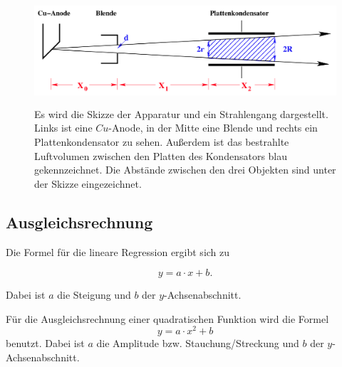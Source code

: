 \begin{figure}
    \centering
    \includegraphics[width=12cm, height=4cm]{build/strahl.png}
    \caption{Es wird die Skizze der Apparatur und ein Strahlengang dargestellt. Links ist eine $Cu$-Anode, in der Mitte eine Blende und rechts ein Plattenkondensator zu sehen. Außerdem ist das bestrahlte Luftvolumen zwischen den Platten des Kondensators blau gekennzeichnet. Die Abstände zwischen den drei Objekten sind unter der Skizze eingezeichnet.\cite{V607}}
    \label{fig:Strahlgeometrie}
\end{figure}

\subsection{Ausgleichsrechnung}

Die Formel für die lineare Regression ergibt sich zu 

\begin{equation}
    y = a \cdot x + b.
    \label{eqn:linreg}
\end{equation}

\noindent Dabei ist $a$ die Steigung und $b$ der $y$-Achsenabschnitt.

\noindent Für die Ausgleichsrechnung einer quadratischen Funktion wird die Formel 
\begin{equation}
    y = a \cdot x^2 + b
    \label{eqn:quadreg}
\end{equation}
benutzt.
Dabei ist $a$ die Amplitude bzw. Stauchung/Streckung und $b$ der $y$-Achsenabschnitt.
